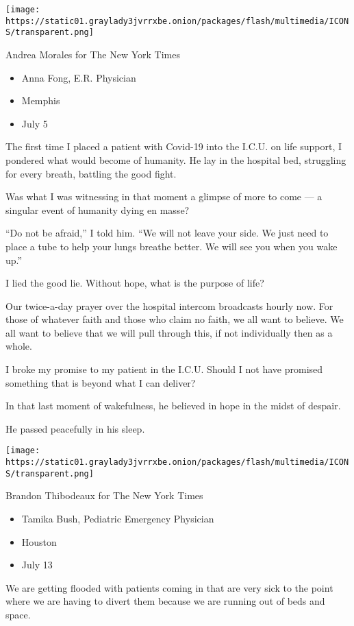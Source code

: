\texttt{[image: https://static01.graylady3jvrrxbe.onion/packages/flash/multimedia/ICONS/transparent.png]}

Andrea Morales for The New York Times

\begin{itemize}
\tightlist
\item
  Anna Fong, E.R. Physician
\item
  Memphis
\item
  July 5
\end{itemize}

The first time I placed a patient with Covid-19 into the I.C.U. on life
support, I pondered what would become of humanity. He lay in the
hospital bed, struggling for every breath, battling the good fight.

Was what I was witnessing in that moment a glimpse of more to come --- a
singular event of humanity dying en masse?

``Do not be afraid,'' I told him. ``We will not leave your side. We just
need to place a tube to help your lungs breathe better. We will see you
when you wake up.''

I lied the good lie. Without hope, what is the purpose of life?

Our twice-a-day prayer over the hospital intercom broadcasts hourly now.
For those of whatever faith and those who claim no faith, we all want to
believe. We all want to believe that we will pull through this, if not
individually then as a whole.

I broke my promise to my patient in the I.C.U. Should I not have
promised something that is beyond what I can deliver?

In that last moment of wakefulness, he believed in hope in the midst of
despair.

He passed peacefully in his sleep.

\texttt{[image: https://static01.graylady3jvrrxbe.onion/packages/flash/multimedia/ICONS/transparent.png]}

Brandon Thibodeaux for The New York Times

\begin{itemize}
\tightlist
\item
  Tamika Bush, Pediatric Emergency Physician
\item
  Houston
\item
  July 13
\end{itemize}

We are getting flooded with patients coming in that are very sick to the
point where we are having to divert them because we are running out of
beds and space.

